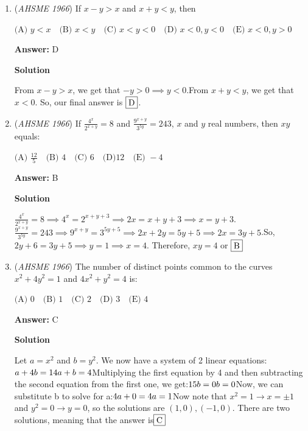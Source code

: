 \begin{enumerate}
 


	\item (\textit{AHSME 1966}) If $x-y>x$ and $x+y<y$, then


 $\text{(A) } y<x \quad \text{(B) } x<y \quad \text{(C) } x<y<0 \quad \text{(D) } x<0,y<0 \quad \text{(E) } x<0,y>0$

 \textbf{Answer: }D



\textbf{Solution}

From $x-y>x$, we get that $-y>0\implies y<0$.From $x+y<y$, we get that $x<0$. So, our final answer is $\fbox{D}$.

 


	\item (\textit{AHSME 1966}) If $\frac{4^x}{2^{x+y}}=8$ and $\frac{9^{x+y}}{3^{5y}}=243$, $x$ and $y$ real numbers, then $xy$ equals:


 $\text{(A) } \frac{12}{5} \quad \text{(B) } 4 \quad \text{(C) } 6 \quad \text{(D)} 12 \quad \text{(E) } -4$

 \textbf{Answer: }B



\textbf{Solution}

$\frac{4^x}{2^{x+y}}=8\implies 4^x = 2^{x+y+3}\implies 2x=x+y+3 \implies x = y+3$.$\frac{9^{x+y}}{3^{5y}}=243\implies 9^{x+y}=3^{5y+5}\implies 2x+2y=5y+5\implies 2x = 3y +5$.So, $2y+6=3y+5\implies y = 1 \implies x = 4$. Therefore, $xy = 4$ or $\fbox{B}$



	\item (\textit{AHSME 1966}) The number of distinct points common to the curves $x^2+4y^2=1$ and $4x^2+y^2=4$ is:


 $\text{(A) } 0 \quad \text{(B) } 1 \quad \text{(C) } 2 \quad \text{(D) } 3 \quad \text{(E) } 4$

 \textbf{Answer: }C



\textbf{Solution}

Let $a=x^2$ and $b=y^2$. We now have a system of 2 linear equations:$a+4b=1\\4a+b=4$Multiplying the first equation by 4 and then subtracting the second equation from the first one, we get:$15b=0\\b=0$Now, we can substitute b to solve for a:$4a+0=4\\a=1$Now note that $x^2=1 \rightarrow x=\pm 1$ and $y^2=0\rightarrow y=0$, so the solutions are $(1,0), (-1, 0)$. There are two solutions, meaning that the answer is$\fbox{C}$




\end{enumerate}
